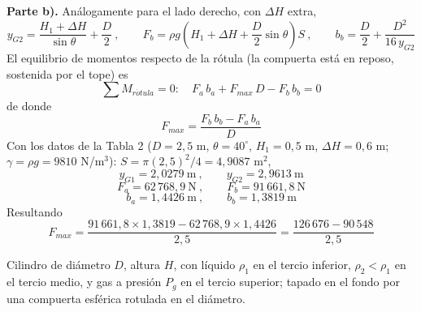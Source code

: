 \documentclass[11pt]{article}
\begin{document}
\textbf{Parte b).} An\'alogamente para el lado derecho, con $\Delta H$ extra,
\begin{equation}
y_{G2}=\frac{H_1+\Delta H}{\sin\theta}+\frac D2\ ,\qquad
F_b=\rho g\!\left(H_1+\Delta H+\frac D2\sin\theta\right)S\ ,\qquad
b_b=\frac D2+\frac{D^2}{16\,y_{G2}}
\end{equation}
El equilibrio de momentos respecto de la r\'otula (la compuerta est\'a en reposo,
sostenida por el tope) es
\begin{equation}
\sum M_{r\acute otula}=0:\quad F_a\,b_a+F_{max}\,D-F_b\,b_b=0
\end{equation}
de donde
\begin{equation}
\boxed{F_{max}=\frac{F_b\,b_b-F_a\,b_a}{D}}
\end{equation}
Con los datos de la Tabla 2 ($D=2{,}5$ m, $\theta=40^\circ$, $H_1=0{,}5$ m,
$\Delta H=0{,}6$ m; $\gamma=\rho g=9810$ N/m$^3$): $S=\pi(2{,}5)^2/4=4{,}9087$ m$^2$,
\begin{equation}
y_{G1}=2{,}0279\ \text{m}\ ,\qquad y_{G2}=2{,}9613\ \text{m}
\end{equation}
\begin{equation}
F_a=62\,768{,}9\ \text{N}\ ,\qquad F_b=91\,661{,}8\ \text{N}
\end{equation}
\begin{equation}
b_a=1{,}4426\ \text{m}\ ,\qquad b_b=1{,}3819\ \text{m}
\end{equation}
Resultando
\begin{equation}
F_{max}=\frac{91\,661{,}8\times1{,}3819-62\,768{,}9\times1{,}4426}{2{,}5}
=\frac{126\,676-90\,548}{2{,}5}
\end{equation}
\begin{center}
\end{center}

\newpage
{}

\noindent Cilindro de di\'ametro $D$, altura $H$, con l\'iquido $\rho_1$ en el tercio
inferior, $\rho_2<\rho_1$ en el tercio medio, y gas a presi\'on $P_g$ en el tercio
superior; tapado en el fondo por una compuerta esf\'erica rotulada en el di\'ametro.
\end{document}

